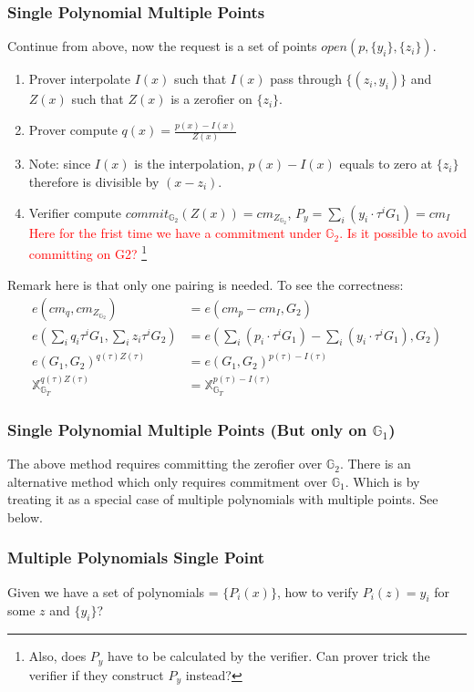 \documentclass[10pt]{article}
\newcommand{\GOne}{\mathbb{G}_1}
\newcommand{\GTwo}{\mathbb{G}_2}
\newcommand{\HL}[1]{\textcolor{red}{#1}}
\begin{document}
\subsubsection{Single Polynomial Multiple Points}
Continue from above, now the request is a set of points $open(p, \{y_i\}, \{z_i\})$.
\begin{enumerate}
    \item Prover interpolate $I(x)$ such that $I(x)$ pass through $\{(z_i, y_i)\}$
        and $Z(x)$ such that $Z(x)$ is a zerofier on $\{z_i\}$.
    \item Prover compute $q(x) = \frac{p(x) - I(x)}{Z(x)}$
    \item Note: since $I(x)$ is the interpolation, $p(x) - I(x)$ equals to zero at
        $\{z_i\}$ therefore is divisible by $(x - z_i)$.
    \item Verifier compute $commit_{\mathbb{G}_2}(Z(x)) =
        cm_{Z_{\mathbb{G}_2}}$, $P_y = \sum_i{(y_i\cdot\tau^{i}G_1)} = cm_{I}$
        \HL{Here for the frist time we have a commitment under $\mathbb{G}_2$. Is it possible to avoid committing on G2?}
        \footnote{Also, does $P_y$ have to be calculated by the verifier. Can prover
        trick the verifier if they construct $P_y$ instead?}
\end{enumerate}
Remark here is that only one pairing is needed.
To see the correctness:
\[
\begin{aligned}
    e({cm}_q, cm_{Z_{\mathbb{G}_2}}) &= e({cm}_p-{cm}_I, G_2)\\
    e(\sum_{i}q_i \tau^iG_1, \sum_i{z_i \tau^i G_2}) 
                   &= e(\sum_{i}(p_i \cdot \tau^iG_1)-
                   \sum_i{(y_i\cdot\tau^{i}G_1)}, G_2)\\
    e(G_1, G_2)^{q(\tau)Z(\tau)} &= e(G_1,G_2)^{p(\tau)-I(\tau)}\\
    \mathbb{X}^{q(\tau)Z(\tau)}_{\mathbb{G}_T} &= \mathbb{X}^{p(\tau)-I(\tau)}_{\mathbb{G}_T}
\end{aligned}
\]

\subsubsection{Single Polynomial Multiple Points (But only on $\mathbb{G}_1$)}
The above method requires committing the zerofier over $\GTwo{}$.
There is an alternative method which only requires commitment over $\GOne$.
Which is by treating it as a special case of multiple polynomials with
multiple points. See below.


\subsubsection{Multiple Polynomials Single Point}
Given we have a set of polynomials = $\{P_i(x)\}$, how to verify 
$P_i(z) = y_i$ for some $z$ and $\{y_i\}$?
\end{document}
